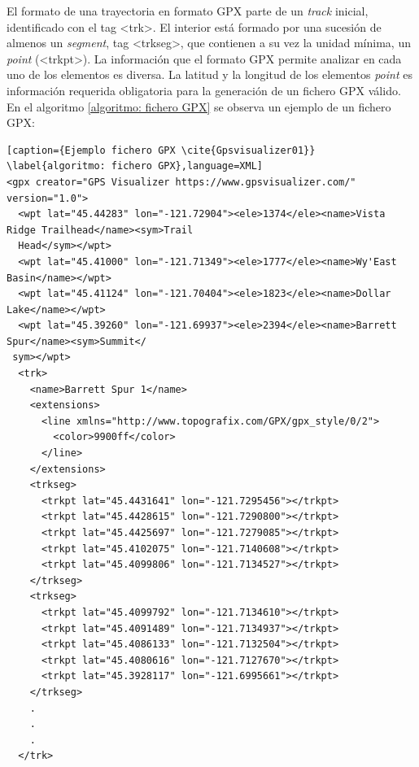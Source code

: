 El formato de una trayectoria en formato \ac{GPX} parte de un \textit{track} inicial, identificado con el tag 
<trk>. El interior está formado por una sucesión de almenos un \textit{segment}, tag <trkseg>, que contienen 
a su vez la unidad mínima, un \textit{point} (<trkpt>). La información que el formato \ac{GPX} permite analizar 
en cada uno de los elementos es diversa. La latitud y la longitud de los elementos \textit{point} es información 
requerida obligatoria para la generación de un fichero \ac{GPX} válido. 
En el algoritmo \ref{algoritmo: fichero GPX} se observa un ejemplo de un fichero \ac{GPX}:

\begin{lstlisting}[caption={Ejemplo fichero GPX \cite{Gpsvisualizer01}} \label{algoritmo: fichero GPX},language=XML] 
<gpx creator="GPS Visualizer https://www.gpsvisualizer.com/" version="1.0">
  <wpt lat="45.44283" lon="-121.72904"><ele>1374</ele><name>Vista Ridge Trailhead</name><sym>Trail 
  Head</sym></wpt>
  <wpt lat="45.41000" lon="-121.71349"><ele>1777</ele><name>Wy'East Basin</name></wpt>
  <wpt lat="45.41124" lon="-121.70404"><ele>1823</ele><name>Dollar Lake</name></wpt>
  <wpt lat="45.39260" lon="-121.69937"><ele>2394</ele><name>Barrett Spur</name><sym>Summit</
 sym></wpt>
  <trk>
    <name>Barrett Spur 1</name>
    <extensions>
      <line xmlns="http://www.topografix.com/GPX/gpx_style/0/2">
        <color>9900ff</color>
      </line>
    </extensions>
    <trkseg>
      <trkpt lat="45.4431641" lon="-121.7295456"></trkpt>
      <trkpt lat="45.4428615" lon="-121.7290800"></trkpt>
      <trkpt lat="45.4425697" lon="-121.7279085"></trkpt>
      <trkpt lat="45.4102075" lon="-121.7140608"></trkpt>
      <trkpt lat="45.4099806" lon="-121.7134527"></trkpt>
    </trkseg>
    <trkseg>
      <trkpt lat="45.4099792" lon="-121.7134610"></trkpt>
      <trkpt lat="45.4091489" lon="-121.7134937"></trkpt>
      <trkpt lat="45.4086133" lon="-121.7132504"></trkpt>
      <trkpt lat="45.4080616" lon="-121.7127670"></trkpt>
      <trkpt lat="45.3928117" lon="-121.6995661"></trkpt>
    </trkseg>
    .
    .
    .
  </trk>

\end{lstlisting}